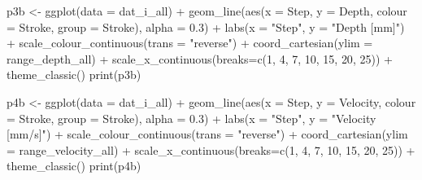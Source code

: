 \documentclass[
]{article}
\newenvironment{Shaded}{\begin{snugshade}}{\end{snugshade}}
\newcommand{\AttributeTok}[1]{\textcolor[rgb]{0.77,0.63,0.00}{#1}}
\newcommand{\DecValTok}[1]{\textcolor[rgb]{0.00,0.00,0.81}{#1}}
\newcommand{\FloatTok}[1]{\textcolor[rgb]{0.00,0.00,0.81}{#1}}
\newcommand{\FunctionTok}[1]{\textcolor[rgb]{0.00,0.00,0.00}{#1}}
\newcommand{\NormalTok}[1]{#1}
\newcommand{\OtherTok}[1]{\textcolor[rgb]{0.56,0.35,0.01}{#1}}
\newcommand{\SpecialCharTok}[1]{\textcolor[rgb]{0.00,0.00,0.00}{#1}}
\newcommand{\StringTok}[1]{\textcolor[rgb]{0.31,0.60,0.02}{#1}}
\begin{document}
\begin{Shaded}
\begin{Highlighting}[]
\NormalTok{  p3b }\OtherTok{\textless{}{-}} \FunctionTok{ggplot}\NormalTok{(}\AttributeTok{data =}\NormalTok{ dat\_i\_all) }\SpecialCharTok{+}
        \FunctionTok{geom\_line}\NormalTok{(}\FunctionTok{aes}\NormalTok{(}\AttributeTok{x =}\NormalTok{ Step, }\AttributeTok{y =}\NormalTok{ Depth, }\AttributeTok{colour =}\NormalTok{ Stroke, }\AttributeTok{group =}\NormalTok{ Stroke), }\AttributeTok{alpha =} \FloatTok{0.3}\NormalTok{) }\SpecialCharTok{+} 
        \FunctionTok{labs}\NormalTok{(}\AttributeTok{x =} \StringTok{"Step"}\NormalTok{, }\AttributeTok{y =} \StringTok{"Depth [mm]"}\NormalTok{) }\SpecialCharTok{+} 
        \FunctionTok{scale\_colour\_continuous}\NormalTok{(}\AttributeTok{trans =} \StringTok{"reverse"}\NormalTok{) }\SpecialCharTok{+} 
        \FunctionTok{coord\_cartesian}\NormalTok{(}\AttributeTok{ylim =}\NormalTok{ range\_depth\_all) }\SpecialCharTok{+}
        \FunctionTok{scale\_x\_continuous}\NormalTok{(}\AttributeTok{breaks=}\FunctionTok{c}\NormalTok{(}\DecValTok{1}\NormalTok{, }\DecValTok{4}\NormalTok{, }\DecValTok{7}\NormalTok{, }\DecValTok{10}\NormalTok{, }\DecValTok{15}\NormalTok{, }\DecValTok{20}\NormalTok{, }\DecValTok{25}\NormalTok{)) }\SpecialCharTok{+}
          \FunctionTok{theme\_classic}\NormalTok{()}
  \FunctionTok{print}\NormalTok{(p3b)}
  
\NormalTok{    p4b }\OtherTok{\textless{}{-}} \FunctionTok{ggplot}\NormalTok{(}\AttributeTok{data =}\NormalTok{ dat\_i\_all) }\SpecialCharTok{+}
        \FunctionTok{geom\_line}\NormalTok{(}\FunctionTok{aes}\NormalTok{(}\AttributeTok{x =}\NormalTok{ Step, }\AttributeTok{y =}\NormalTok{ Velocity, }\AttributeTok{colour =}\NormalTok{ Stroke, }\AttributeTok{group =}\NormalTok{ Stroke), }\AttributeTok{alpha =} \FloatTok{0.3}\NormalTok{) }\SpecialCharTok{+} 
        \FunctionTok{labs}\NormalTok{(}\AttributeTok{x =} \StringTok{"Step"}\NormalTok{, }\AttributeTok{y =} \StringTok{"Velocity [mm/s]"}\NormalTok{) }\SpecialCharTok{+} 
        \FunctionTok{scale\_colour\_continuous}\NormalTok{(}\AttributeTok{trans =} \StringTok{"reverse"}\NormalTok{) }\SpecialCharTok{+} 
        \FunctionTok{coord\_cartesian}\NormalTok{(}\AttributeTok{ylim =}\NormalTok{ range\_velocity\_all) }\SpecialCharTok{+}
        \FunctionTok{scale\_x\_continuous}\NormalTok{(}\AttributeTok{breaks=}\FunctionTok{c}\NormalTok{(}\DecValTok{1}\NormalTok{, }\DecValTok{4}\NormalTok{, }\DecValTok{7}\NormalTok{, }\DecValTok{10}\NormalTok{, }\DecValTok{15}\NormalTok{, }\DecValTok{20}\NormalTok{, }\DecValTok{25}\NormalTok{)) }\SpecialCharTok{+}
          \FunctionTok{theme\_classic}\NormalTok{()}
  \FunctionTok{print}\NormalTok{(p4b)}
  

\end{Highlighting}
\end{Shaded}
\end{document}
